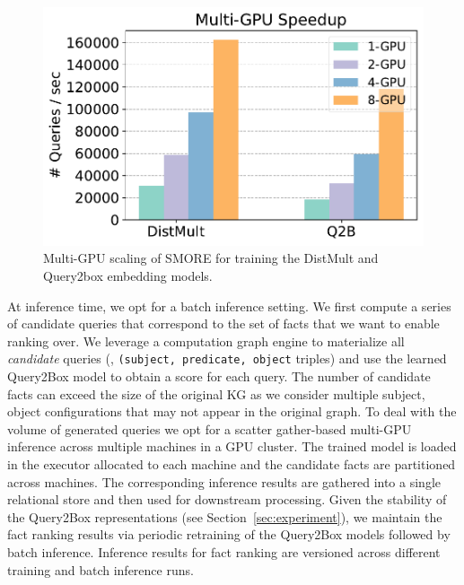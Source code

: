 \begin{figure}[t]
\centering
    \includegraphics[width=0.3\columnwidth]{submissions/Ali2023/figures/wiki-speedup.pdf}
    \caption{Multi-GPU scaling of SMORE for training the DistMult and Query2box embedding models.
    }
\label{fig:speedup}
\end{figure}

At inference time, we opt for a batch inference setting. We first compute a series of candidate queries that correspond to the set of facts that we want to enable ranking over. We leverage a computation graph engine to materialize all \emph{candidate} queries (\ie, \texttt{(subject, predicate, object} triples) and use the learned Query2Box model to obtain a score for each query. The number of candidate facts can exceed the size of the original KG as we consider multiple subject, object configurations that may not appear in the original graph. To deal with the volume of generated queries we opt for a scatter gather-based multi-GPU inference across multiple machines in a GPU cluster. The trained model is loaded in the executor allocated to each machine and the candidate facts are partitioned across machines. The corresponding inference results are gathered into a single relational store and then used for downstream processing. Given the stability of the Query2Box representations (see Section~\ref{sec:experiment}), we maintain the fact ranking results via periodic retraining of the Query2Box models followed by batch inference. Inference results for fact ranking are versioned across different training and batch inference runs.

\iffalse


